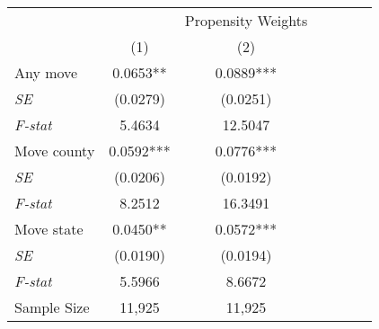 \begin{tabular}{lcccccc}
\toprule
\toprule
 & & Propensity Weights  \\
 & (1) & (2)  \\
\midrule 
 Any move & 0.0653** & 0.0889*** \\
 \textit{SE} & (0.0279) & (0.0251) \\
 \textit{F-stat} & 5.4634 & 12.5047 \\
 Move county & 0.0592*** & 0.0776*** \\
 \textit{SE} & (0.0206) & (0.0192) \\
 \textit{F-stat} & 8.2512 & 16.3491 \\
 Move state & 0.0450** & 0.0572*** \\
 \textit{SE} & (0.0190) & (0.0194) \\
 \textit{F-stat} & 5.5966 & 8.6672 \\
Sample Size & 11,925 & 11,925  \\
\bottomrule
\bottomrule
\end{tabular}
